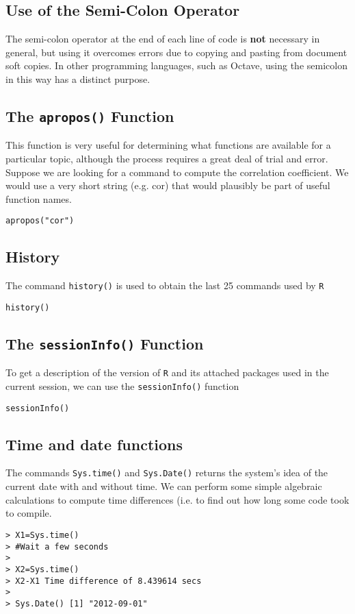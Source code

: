 \documentclass[a4paper,12pt]{article}
\begin{document}
\subsection{Use of the Semi-Colon Operator}

The semi-colon operator at the end of each line of code is \textbf{not} necessary
in general, but using it overcomes errors due to copying and pasting from document soft
copies. In other programming languages, such as Octave, using the semicolon in this way
has a distinct purpose.

\subsection{The \texttt{apropos()} Function}
This function is very useful for determining what functions are available for a particular topic, although the process requires a great deal of trial and error.
Suppose we are looking for a command to compute the correlation coefficient. We would use a very short string (e.g. cor) that would plausibly be part of useful function names.
\begin{verbatim}
apropos("cor")
\end{verbatim}

\subsection{History}
The command \texttt{history()} is used to obtain the last 25 commands used by \texttt{R}
\begin{verbatim}
history()
\end{verbatim}
\subsection{The \texttt{sessionInfo()} Function }
To get a description of the version of  \texttt{R} and its attached packages used in the current session, we can use the \texttt{sessionInfo()} function

\begin{verbatim}
sessionInfo()
\end{verbatim}
\subsection{Time and date functions}
The commands \texttt{Sys.time()} and \texttt{Sys.Date()} returns the system's idea of the current date with and without time.
We can perform some simple algebraic calculations to compute time differences (i.e. to find out how long some code took to compile.
\begin{verbatim}
> X1=Sys.time()
> #Wait a few seconds
>
> X2=Sys.time()
> X2-X1 Time difference of 8.439614 secs
>
> Sys.Date() [1] "2012-09-01"
\end{verbatim}
\end{document}
